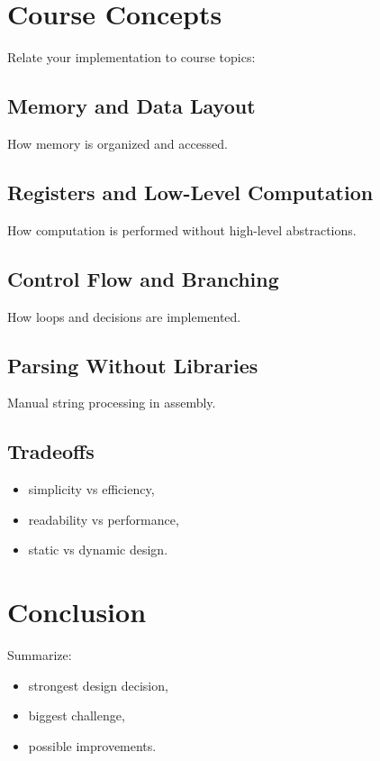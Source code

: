 \documentclass[a4paper,12pt]{article}
\begin{document}
\section{Course Concepts}

Relate your implementation to course topics:

\subsection{Memory and Data Layout}

How memory is organized and accessed.

\subsection{Registers and Low-Level Computation}

How computation is performed without high-level abstractions.

\subsection{Control Flow and Branching}

How loops and decisions are implemented.

\subsection{Parsing Without Libraries}

Manual string processing in assembly.

\subsection{Tradeoffs}

\begin{itemize}
\item simplicity vs efficiency,
\item readability vs performance,
\item static vs dynamic design.
\end{itemize}

\section{Conclusion}

Summarize:

\begin{itemize}
\item strongest design decision,
\item biggest challenge,
\item possible improvements.
\end{itemize}
\end{document}

